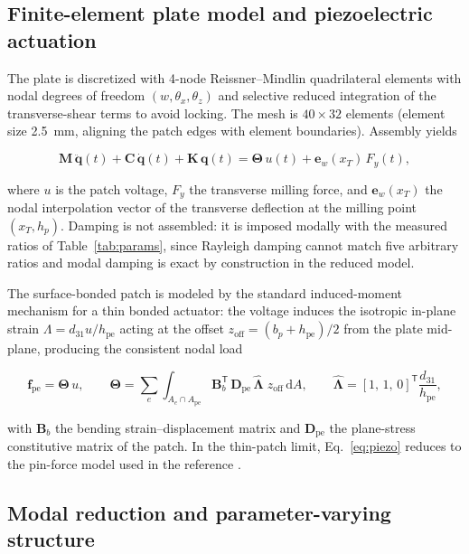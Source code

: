 \documentclass[preprint,12pt]{elsarticle}
\newcommand{\T}{\mathsf{T}}
\begin{document}
\subsection{Finite-element plate model and piezoelectric actuation}
\label{sec:fem}

The plate is discretized with 4-node Reissner--Mindlin quadrilateral
elements with nodal degrees of freedom $(w, \theta_x, \theta_z)$ and
selective reduced integration of the transverse-shear terms to avoid
locking. The mesh is $40 \times 32$ elements (element size 2.5~mm,
aligning the patch edges with element boundaries). Assembly yields

\begin{equation}
\label{eq:fem}
\mathbf{M}\,\ddot{\mathbf{q}}(t) + \mathbf{C}\,\dot{\mathbf{q}}(t)
+ \mathbf{K}\,\mathbf{q}(t)
= \boldsymbol{\Theta}\, u(t) + \mathbf{e}_w(x_T)\, F_y(t),
\end{equation}

where $u$ is the patch voltage, $F_y$ the transverse milling force, and
$\mathbf{e}_w(x_T)$ the nodal interpolation vector of the transverse
deflection at the milling point $(x_T, h_p)$. Damping is not assembled:
it is imposed modally with the measured ratios of
Table~\ref{tab:params}, since Rayleigh damping cannot match five
arbitrary ratios and modal damping is exact by construction in the
reduced model.

The surface-bonded patch is modeled by the standard induced-moment
mechanism for a thin bonded actuator: the voltage induces the isotropic
in-plane strain $\Lambda = d_{31} u / h_{\mathrm{pe}}$ acting at the
offset $z_{\mathrm{off}} = (b_p + h_{\mathrm{pe}})/2$ from the plate
mid-plane, producing the consistent nodal load

\begin{equation}
\label{eq:piezo}
\mathbf{f}_{\mathrm{pe}} = \boldsymbol{\Theta}\, u,
\qquad
\boldsymbol{\Theta} = \sum_e \int_{A_e \cap A_{\mathrm{pe}}}
\mathbf{B}_b^{\T}\, \mathbf{D}_{\mathrm{pe}}\,
\hat{\boldsymbol{\Lambda}}\; z_{\mathrm{off}}\, \mathrm{d}A,
\qquad
\hat{\boldsymbol{\Lambda}} = [1,\, 1,\, 0]^{\T}
\frac{d_{31}}{h_{\mathrm{pe}}},
\end{equation}

with $\mathbf{B}_b$ the bending strain--displacement matrix and
$\mathbf{D}_{\mathrm{pe}}$ the plane-stress constitutive matrix of the
patch. In the thin-patch limit, Eq.~\eqref{eq:piezo} reduces to the
pin-force model used in the reference \cite{du2024robust}.

\subsection{Modal reduction and parameter-varying structure}
\label{sec:modal}
\end{document}
